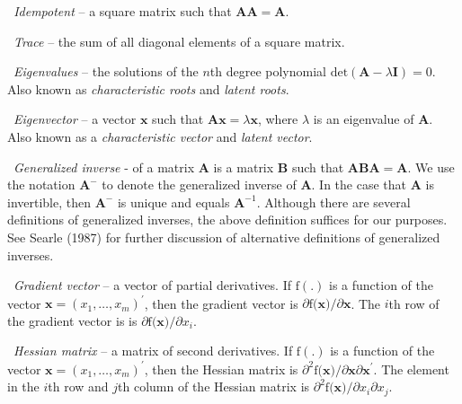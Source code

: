 \textbullet \emph{\ Idempotent }-- a square matrix such that $\mathbf{AA=A}$.

\textbullet\ \emph{Trace} -- the sum of all diagonal elements of a square
matrix.

\textbullet\ \emph{Eigenvalues} -- the solutions of the $n$th degree
polynomial $\mathrm{det}(\mathbf{A-}\lambda \mathbf{I})=0$. Also
known as \emph{characteristic roots} and \emph{latent
roots}.

\textbullet\ \emph{Eigenvector }-- a vector $\mathbf{x}$ such that
$\mathbf{ Ax=}\lambda \mathbf{x}$, where $\lambda$ is an eigenvalue
of $\mathbf{A}$. Also known as a \emph{characteristic vector} and
\emph{latent vector}.

\textbullet\ \emph{Generalized inverse} - of a matrix $\mathbf{A}$
is a matrix $\mathbf{B}$ such that $\mathbf{ABA=A.}$ We use the
notation $\mathbf{ A}^{-}$ to denote the generalized inverse of
$\mathbf{A}$. In the case that $ \mathbf{A}$ is invertible, then
$\mathbf{A}^{-}$ is unique and equals $ \mathbf{A}^{-1}$. Although
there are several definitions of generalized inverses, the above
definition suffices for our purposes. See Searle (1987) for further
discussion of alternative definitions of generalized
inverses.

\textbullet\ \emph{Gradient vector} -- a vector of partial
derivatives. If $ \mathrm{f}(.)$ is a function of the vector
$\mathbf{x}=(x_1,\ldots ,x_m)^{\prime}$, then the gradient vector is
$\partial \mathrm{f}(\mathbf{ x)}/\partial \mathbf{x}$. The $i$th
row of the gradient vector is is $\partial \mathrm{f}
(\mathbf{x)}/\partial x_i$.

\textbullet\ \emph{Hessian matrix} -- a matrix of second
derivatives. If $ \mathrm{f}(.)$ is a function of the vector
$\mathbf{x}=(x_1,\ldots ,x_m)^{\prime}$, then the Hessian matrix is
$\partial^2 \mathrm{f}( \mathbf{x)}/\partial \mathbf{x}\partial
\mathbf{x}^{\mathbf{\prime}}$. The element in the $i$th row and
$j$th column of the Hessian matrix is $\partial
^{2}\mathrm{f}(\mathbf{x)}/\partial x_i\partial x_j$.
